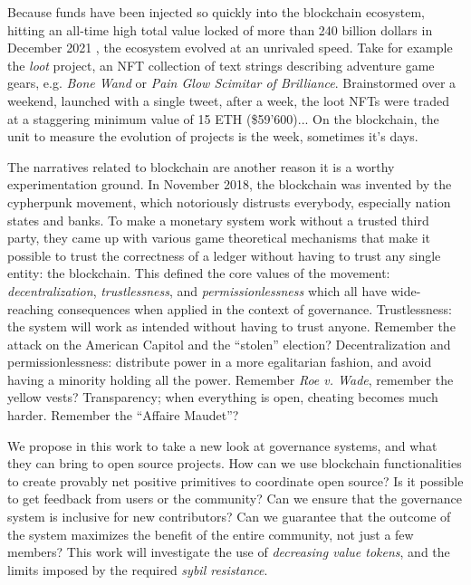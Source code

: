 \leavevmode{}Because funds have been injected so quickly into the blockchain ecosystem, hitting an all-time high total value locked of more than 240 billion dollars in December 2021 \cite{noauthor_defillama_nodate}, the ecosystem evolved at an unrivaled speed.
Take for example the \textit{loot} project, an NFT collection of text strings describing adventure game gears, e.g. \emph{Bone Wand} or \emph{Pain Glow Scimitar of Brilliance}.
Brainstormed over a weekend, launched with a single tweet, after a week, the loot NFTs were traded at a staggering minimum value of 15 ETH (\$59'600)...
On the blockchain, the unit to measure the evolution of projects is the week, sometimes it's days.

\leavevmode{}The narratives related to blockchain are another reason it is a worthy experimentation ground.
In November 2018, the blockchain was invented by the cypherpunk movement, which notoriously distrusts everybody, especially nation states and banks.
To make a monetary system work without a trusted third party, they came up with various game theoretical mechanisms that make it possible to trust the correctness of a ledger without having to trust any single entity: the blockchain.
This defined the core values of the movement: \emph{decentralization}, \emph{trustlessness}, and \emph{permissionlessness} which all have wide-reaching consequences when applied in the context of governance.
Trustlessness: the system will work as intended without having to trust anyone.
Remember the attack on the American Capitol and the \enquote{stolen} election?
Decentralization and permissionlessness: distribute power in a more egalitarian fashion, and avoid having a minority holding all the power.
Remember \emph{Roe v. Wade}, remember the yellow vests?
Transparency; when everything is open, cheating becomes much harder.
Remember the \enquote{Affaire Maudet}?

\leavevmode{}We propose in this work to take a new look at governance systems, and what they can bring to open source projects.
How can we use blockchain functionalities to create provably net positive primitives to coordinate open source?
Is it possible to get feedback from users or the community?
Can we ensure that the governance system is inclusive for new contributors?
Can we guarantee that the outcome of the system maximizes the benefit of the entire community, not just a few members?
This work will investigate the use of \emph{decreasing value tokens}, and the limits imposed by the required \emph{sybil resistance}.

